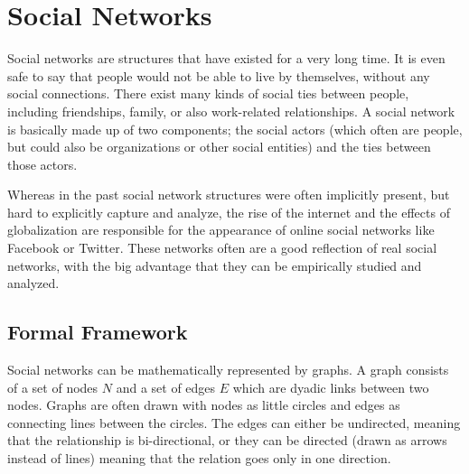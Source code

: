 \section{Social Networks}
\label{s:socialnetworks} Social networks are structures that have existed for a very long time. It is even safe to say that people would not be able to live by themselves, without any social connections. There exist many kinds of social ties between people, including friendships, family, or also work-related relationships. A social network is basically made up of two components; the social actors (which often are people, but could also be organizations or other social entities) and the ties between those actors.

Whereas in the past social network structures were often implicitly present, but hard to explicitly capture and analyze, the rise of the internet and the effects of globalization are responsible for the appearance of online social networks like Facebook or Twitter. These networks often are a good reflection of real social networks, with the big advantage that they can be empirically studied and analyzed.

\subsection{Formal Framework}
\label{sst:formalframeworkgraphs} Social networks can be mathematically represented by graphs. A graph consists of a set of nodes $N$ and a set of edges $E$ which are dyadic links between two nodes. Graphs are often drawn with nodes as little circles and edges as connecting lines between the circles. The edges can either be undirected, meaning that the relationship is bi-directional, or they can be directed (drawn as arrows instead of lines) meaning that the relation goes only in one direction.

